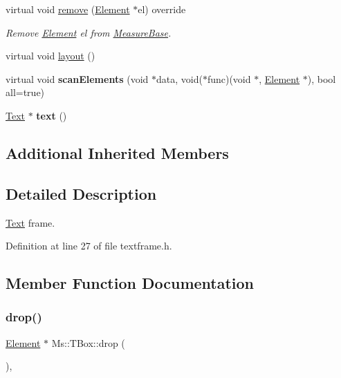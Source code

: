 \begin{DoxyCompactItemize}
\mbox{\label{class_ms_1_1_t_box_aead93220fc65a5df466c399228c8ac4f}} 
virtual void \hyperlink{class_ms_1_1_t_box_aead93220fc65a5df466c399228c8ac4f}{remove} (\hyperlink{class_ms_1_1_element}{Element} $\ast$el) override
\begin{DoxyCompactList}\small\item\em Remove \hyperlink{class_ms_1_1_element}{Element} {\itshape el} from \hyperlink{class_ms_1_1_measure_base}{Measure\+Base}. \end{DoxyCompactList}\item 
virtual void \hyperlink{class_ms_1_1_t_box_a27cc5764749ca4d16fdd6eb1dc41d215}{layout} ()
\item 
\mbox{\label{class_ms_1_1_t_box_a8eb3d86f0f95a674c3d24acab1f89b27}} 
virtual void {\bfseries scan\+Elements} (void $\ast$data, void($\ast$func)(void $\ast$, \hyperlink{class_ms_1_1_element}{Element} $\ast$), bool all=true)
\item 
\mbox{\label{class_ms_1_1_t_box_a67a0d4ccc8145d56eb2ebd5b16add50a}} 
\hyperlink{class_ms_1_1_text}{Text} $\ast$ {\bfseries text} ()
\end{DoxyCompactItemize}
\subsection*{Additional Inherited Members}


\subsection{Detailed Description}
\hyperlink{class_ms_1_1_text}{Text} frame. 

Definition at line 27 of file textframe.\+h.



\subsection{Member Function Documentation}
\mbox{\label{class_ms_1_1_t_box_a3be73eda7f604bdaa08d124d68a84bca}} 
\subsubsection{\texorpdfstring{drop()}{drop()}}
{\footnotesize\ttfamily \hyperlink{class_ms_1_1_element}{Element} $\ast$ Ms\+::\+T\+Box\+::drop (\begin{DoxyParamCaption}\item[{\hyperlink{class_ms_1_1_edit_data}{Edit\+Data} \&}]{ }\end{DoxyParamCaption})\hspace{0.3cm}{\ttfamily [override]}, {\ttfamily [virtual]}}

